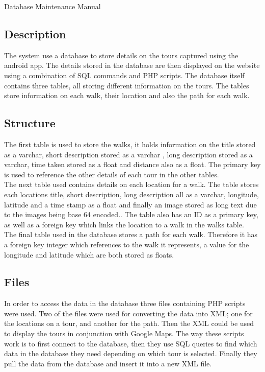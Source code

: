 \documentclass{article}
\begin{document}
	\begin{section}{Database Maintenance Manual}
		\subsection{Description}
		The system use a database to store details on the tours captured using the android app. The details stored in the database are then displayed on the website using a combination of SQL commands and PHP scripts. The database itself contains three tables, all storing different information on the tours. The tables store information on each walk, their location and also the path for each walk.


		\subsection{Structure}
		The first table is used to store the walks, it holds information on the title stored as a varchar, short description stored as a varchar , long description stored as a varchar, time taken stored as a float and distance also as a float. The primary key is used to reference the other details of each tour in the other tables. \\
		
		The next table used contains details on each location for a walk. The table stores each locations title, short description, long description all as a varchar, longitude, latitude and a time stamp as a float and finally an image stored as long text due to the images being base 64 encoded.. The table also has an ID as a primary key, as well as a foreign key which links the location to a walk in the walks table. \\
		
		The final table used in the database stores a path for each walk. Therefore it has a foreign key integer which references to the walk it represents, a value for the longitude and latitude which are both stored as floats. 

		\subsection{Files}
		In order to access the data in the database three files containing PHP scripts were used. Two of the files were used for converting the data into XML; one for the locations on a tour, and another for the path. Then the XML could be used to display the tours in conjunction with Google Maps. The way these scripts work is to first connect to the database, then they use SQL queries to find which data in the database they need depending on which tour is selected. Finally they pull the data from the database and insert it into a new XML file. \\
		

\end{section}
\end{document}
